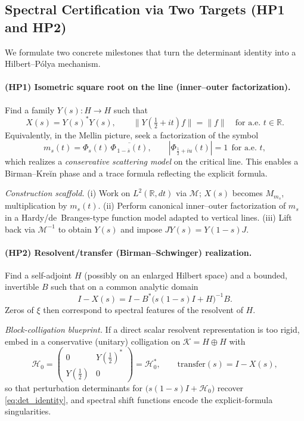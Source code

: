 \documentclass[11pt]{article}
\numberwithin{equation}{section}
\theoremstyle{definition}
\theoremstyle{remark}
\newcommand{\1}{\mathbbm{1}}
\begin{document}
\subsection{Spectral Certification via Two Targets (HP1 and HP2)}

We formulate two concrete milestones that turn the determinant identity into a Hilbert–Pólya mechanism.

\paragraph{(HP1) Isometric square root on the line (inner–outer factorization).}
Find a family \(Y(s):H\to H\) such that
\begin{equation}
X(s)=Y(s)^{*}Y(s),
\qquad
\|Y(\tfrac12+it)f\|=\|f\|\quad\text{for a.e. }t\in\mathbb{R}.
\end{equation}
Equivalently, in the Mellin picture, seek a factorization of the symbol
\begin{equation}
m_s(t)=\Phi_s(t)\,\overline{\Phi_{\,1-\overline{s}}(t)},
\qquad
|\Phi_{\frac12+iu}(t)|=1\ \ \text{for a.e. }t,
\end{equation}
which realizes a \emph{conservative scattering model} on the critical line. This enables a Birman–Kreĭn phase and a trace formula reflecting the explicit formula.

\emph{Construction scaffold.}
(i) Work on \(L^2(\mathbb{R},dt)\) via \(\mathcal{M}\); \(X(s)\) becomes \(M_{m_s}\), multiplication by \(m_s(t)\).
(ii) Perform canonical inner–outer factorization of \(m_s\) in a Hardy/de~Branges-type function model adapted to vertical lines.
(iii) Lift back via \(\mathcal{M}^{-1}\) to obtain \(Y(s)\) and impose \(JY(s)=Y(1-s)J\).

\paragraph{(HP2) Resolvent/transfer (Birman–Schwinger) realization.}
Find a self-adjoint \(H\) (possibly on an enlarged Hilbert space) and a bounded, invertible \(B\) such that on a common analytic domain
\begin{equation}
\boxed{\quad I-X(s)=I- B^{*}\big(s(1-s)I+H\big)^{-1}B.\quad}
\end{equation}
Zeros of \(\xi\) then correspond to spectral features of the resolvent of \(H\).

\emph{Block-colligation blueprint.}
If a direct scalar resolvent representation is too rigid, embed in a conservative (unitary) colligation on \(\mathcal{K}=H\oplus H\) with
\[
\mathcal{H}_0=\begin{pmatrix}0 & Y(\tfrac12)^{*}\\[2pt] Y(\tfrac12) & 0\end{pmatrix}=\mathcal{H}_0^{*},
\qquad
\text{transfer}(s)=I-X(s),
\]
so that perturbation determinants for \(\big(s(1-s)I+\mathcal{H}_0\big)\) recover \eqref{eq:det_identity}, and spectral shift functions encode the explicit-formula singularities.
\end{document}
